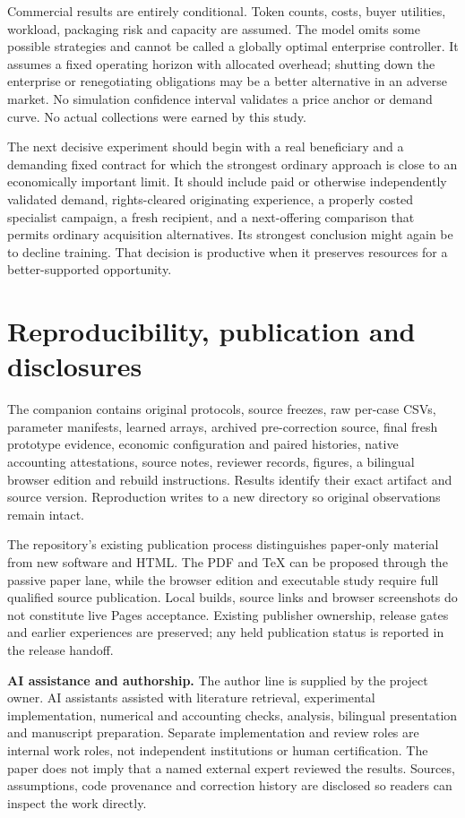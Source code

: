 \documentclass[11pt,letterpaper]{article}
\begin{document}
Commercial results are entirely conditional. Token counts, costs, buyer utilities, workload, packaging risk and capacity are assumed. The model omits some possible strategies and cannot be called a globally optimal enterprise controller. It assumes a fixed operating horizon with allocated overhead; shutting down the enterprise or renegotiating obligations may be a better alternative in an adverse market. No simulation confidence interval validates a price anchor or demand curve. No actual collections were earned by this study.

The next decisive experiment should begin with a real beneficiary and a demanding fixed contract for which the strongest ordinary approach is close to an economically important limit. It should include paid or otherwise independently validated demand, rights-cleared originating experience, a properly costed specialist campaign, a fresh recipient, and a next-offering comparison that permits ordinary acquisition alternatives. Its strongest conclusion might again be to decline training. That decision is productive when it preserves resources for a better-supported opportunity.

\section{Reproducibility, publication and disclosures}

The companion contains original protocols, source freezes, raw per-case CSVs, parameter manifests, learned arrays, archived pre-correction source, final fresh prototype evidence, economic configuration and paired histories, native accounting attestations, source notes, reviewer records, figures, a bilingual browser edition and rebuild instructions. Results identify their exact artifact and source version. Reproduction writes to a new directory so original observations remain intact.

The repository's existing publication process distinguishes paper-only material from new software and HTML. The PDF and TeX can be proposed through the passive paper lane, while the browser edition and executable study require full qualified source publication. Local builds, source links and browser screenshots do not constitute live Pages acceptance. Existing publisher ownership, release gates and earlier experiences are preserved; any held publication status is reported in the release handoff.

\textbf{AI assistance and authorship.} The author line is supplied by the project owner. AI assistants assisted with literature retrieval, experimental implementation, numerical and accounting checks, analysis, bilingual presentation and manuscript preparation. Separate implementation and review roles are internal work roles, not independent institutions or human certification. The paper does not imply that a named external expert reviewed the results. Sources, assumptions, code provenance and correction history are disclosed so readers can inspect the work directly.
\end{document}

